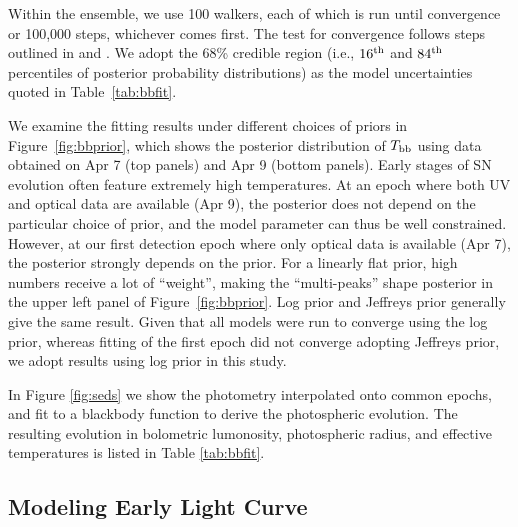 \documentclass[twocolumn]{aastex63}
\begin{document}
\begin{CJK*}{UTF8}{gbsn}
Within the ensemble, we use 100 walkers, each of which is run until convergence or 100,000 steps, 
whichever comes first. The test for convergence follows steps outlined in \citet{Yao2019} and 
\citet{Miller2020}. We adopt the 68\% credible region (i.e., $16^{\rm th}$ and $84^{\rm th}$ percentiles 
of posterior probability distributions) as the model uncertainties quoted in Table~\ref{tab:bbfit}.

We examine the fitting results under different choices of priors in Figure~\ref{fig:bbprior}, which shows 
the posterior distribution of $T_{\rm bb}$ using data obtained on Apr 7 (top panels) and Apr 9 (bottom 
panels). Early stages of SN evolution often feature extremely high temperatures. At an epoch where 
both UV and optical data are available (Apr 9), the posterior does not depend on the particular choice 
of prior, and the model parameter can thus be well constrained. However, at our first detection epoch 
where only optical data is available (Apr 7), the posterior strongly depends on the prior. For a linearly 
flat prior, high numbers receive a lot of ``weight'', making the ``multi-peaks'' shape posterior in the 
upper left panel of Figure~\ref{fig:bbprior}. Log prior and Jeffreys prior generally give the same result. 
Given that all models were run to converge using the log prior, whereas fitting of the first epoch did 
not converge adopting Jeffreys prior, we adopt results using log prior in this study.

In Figure \ref{fig:seds} we show the photometry interpolated onto common epochs, and fit to a 
blackbody function to derive the photospheric evolution. The resulting evolution in bolometric 
lumonosity, photospheric radius, and effective temperatures is listed in Table  \ref{tab:bbfit}.

\subsection{Modeling Early Light Curve} \label{subsec:p15fit}


\end{CJK*}
\end{document}
